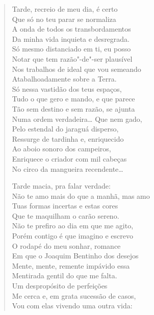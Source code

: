 \begin{verse}
Tarde, recreio de meu dia, é certo\\
Que só no teu parar se normaliza\\
A onda de todos os transbordamentos\\
Da minha vida inquieta e desregrada.\\
Só mesmo distanciado em ti, eu posso\\
Notar que tem razão"-de"-ser plausível\\
Nos trabalhos de ideal que vou semeando\\
Atabalhoadamente sobre a Terra.\\
Só nessa vastidão dos teus espaços,\\
Tudo o que gero e mando, e que parece\\
Tão sem destino e sem razão, se ajunta\\
Numa ordem verdadeira\ldots{} Que nem gado,\\
Pelo estendal do jaraguá disperso,\\
Ressurge de tardinha e, enriquecido\\
Ao aboio sonoro dos campeiros,\\
Enriquece o criador com mil cabeças\\
No circo da mangueira recendente\ldots{}

Tarde macia, pra falar verdade:\\
Não te amo mais do que a manhã, mas amo\\
Tuas formas incertas e estas cores\\
Que te maquilham o carão sereno.\\
Não te prefiro ao dia em que me agito,\\
Porém contigo é que imagino e escrevo\\
O rodapé do meu sonhar, romance\\
Em que o Joaquim Bentinho dos desejos\\
Mente, mente, remente impávido essa\\
Mentirada gentil do que me falta.\\
Um despropósito de perfeições\\
Me cerca e, em grata sucessão de casos,\\
Vou com elas vivendo uma outra vida:


\end{verse}
